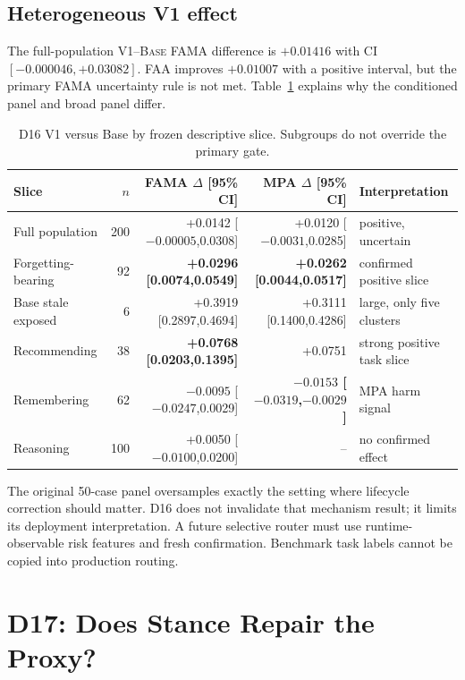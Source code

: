 \documentclass[10pt]{article}
\newcommand{\base}{\textsc{Base}\xspace}
\newcommand{\vone}{\textsc{V1}\xspace}
\begin{document}
\subsection{Heterogeneous V1 effect}

The full-population \vone--\base FAMA difference is $+0.01416$ with CI $[-0.000046,+0.03082]$. FAA improves $+0.01007$ with a positive interval, but the primary FAMA uncertainty rule is not met. Table~\ref{tab:subgroups} explains why the conditioned panel and broad panel differ.

\begin{table}[H]
\centering
\footnotesize
\begin{tabular}{lrrrl}
\toprule
Slice & $n$ & FAMA $\Delta$ [95\% CI] & MPA $\Delta$ [95\% CI] & Interpretation \\
\midrule
Full population & 200 & +0.0142 [$-0.00005$,0.0308] & +0.0120 [$-0.0031$,0.0285] & positive, uncertain \\
Forgetting-bearing & 92 & \textbf{+0.0296 [0.0074,0.0549]} & \textbf{+0.0262 [0.0044,0.0517]} & confirmed positive slice \\
Base stale exposed & 6 & +0.3919 [0.2897,0.4694] & +0.3111 [0.1400,0.4286] & large, only five clusters \\
Recommending & 38 & \textbf{+0.0768 [0.0203,0.1395]} & +0.0751 & strong positive task slice \\
Remembering & 62 & $-0.0095$ [$-0.0247$,0.0029] & \textbf{$-0.0153$ [$-0.0319$,$-0.0029$]} & MPA harm signal \\
Reasoning & 100 & +0.0050 [$-0.0100$,0.0200] & -- & no confirmed effect \\
\bottomrule
\end{tabular}
\caption{D16 V1 versus Base by frozen descriptive slice. Subgroups do not override the primary gate.}
\label{tab:subgroups}
\end{table}

The original 50-case panel oversamples exactly the setting where lifecycle correction should matter. D16 does not invalidate that mechanism result; it limits its deployment interpretation. A future selective router must use runtime-observable risk features and fresh confirmation. Benchmark task labels cannot be copied into production routing.

\section{D17: Does Stance Repair the Proxy?}
\end{document}
